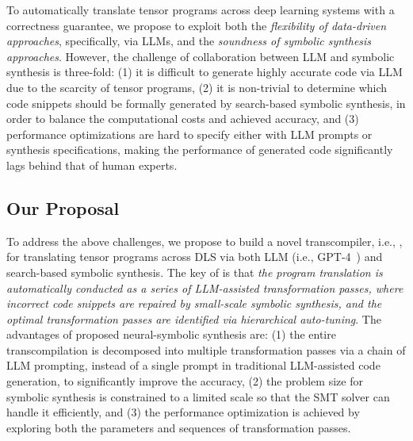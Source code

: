 To automatically translate tensor programs across deep learning systems with a correctness guarantee, we propose to exploit both the \emph{flexibility of data-driven approaches}, specifically, via LLMs, and the \emph{soundness of symbolic synthesis approaches}. However, the challenge of collaboration between LLM and symbolic synthesis is three-fold: (1) it is difficult to generate highly accurate code via LLM due to the scarcity of tensor programs, (2) it is non-trivial to determine which code snippets should be formally generated by search-based symbolic synthesis, in order to balance the computational costs and achieved accuracy, and (3) performance optimizations are hard to specify either with LLM prompts or synthesis specifications, making the performance of generated code significantly lags behind that of human experts.

\subsection{Our Proposal}
To address the above challenges, we propose to build a novel transcompiler, i.e., \name{}, for translating tensor programs across DLS via both LLM (i.e., GPT-4~\cite{bubeck2023sparks}) and search-based symbolic synthesis. The key of \name{} is that \emph{the program translation is automatically conducted as a series of LLM-assisted transformation passes, where incorrect code snippets are repaired by small-scale symbolic synthesis, and the optimal transformation passes are identified via hierarchical auto-tuning}. The advantages of proposed neural-symbolic synthesis are: (1) the entire transcompilation is decomposed into multiple transformation passes via a chain of LLM prompting, instead of a single prompt in traditional LLM-assisted code generation, to significantly improve the accuracy, (2) the problem size for symbolic synthesis is constrained to a limited scale so that the SMT solver can handle it efficiently, and (3) the performance optimization is achieved by exploring both the parameters and sequences of transformation passes.


